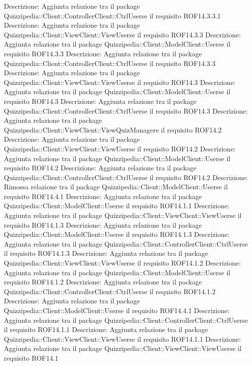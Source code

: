 Descrizione: Aggiunta relazione tra il package Quizzipedia::Client::ControllerClient::CtrlUserse il requisito ROF14.3.3.1 
Descrizione: Aggiunta relazione tra il package Quizzipedia::Client::ViewClient::ViewUserse il requisito ROF14.3.3 
Descrizione: Aggiunta relazione tra il package Quizzipedia::Client::ModelClient::Userse il requisito ROF14.3.3 
Descrizione: Aggiunta relazione tra il package Quizzipedia::Client::ControllerClient::CtrlUserse il requisito ROF14.3.3 
Descrizione: Aggiunta relazione tra il package Quizzipedia::Client::ViewClient::ViewUserse il requisito ROF14.3 
Descrizione: Aggiunta relazione tra il package Quizzipedia::Client::ModelClient::Userse il requisito ROF14.3 
Descrizione: Aggiunta relazione tra il package Quizzipedia::Client::ControllerClient::CtrlUserse il requisito ROF14.3 
Descrizione: Aggiunta relazione tra il package Quizzipedia::Client::ViewClient::ViewQuizManagere il requisito ROF14.2 
Descrizione: Aggiunta relazione tra il package Quizzipedia::Client::ViewClient::ViewUserse il requisito ROF14.2 
Descrizione: Aggiunta relazione tra il package Quizzipedia::Client::ModelClient::Userse il requisito ROF14.2 
Descrizione: Aggiunta relazione tra il package Quizzipedia::Client::ControllerClient::CtrlUserse il requisito ROF14.2 
Descrizione: Rimossa relazione tra il package Quizzipedia::Client::ModelClient::Userse il requisito ROF14.4.1 
Descrizione: Aggiunta relazione tra il package Quizzipedia::Client::ModelClient::Userse il requisito ROF14.1.1 
Descrizione: Aggiunta relazione tra il package Quizzipedia::Client::ViewClient::ViewUserse il requisito ROF14.1.3 
Descrizione: Aggiunta relazione tra il package Quizzipedia::Client::ModelClient::Userse il requisito ROF14.1.3 
Descrizione: Aggiunta relazione tra il package Quizzipedia::Client::ControllerClient::CtrlUserse il requisito ROF14.1.3 
Descrizione: Aggiunta relazione tra il package Quizzipedia::Client::ViewClient::ViewUserse il requisito ROF14.1.2 
Descrizione: Aggiunta relazione tra il package Quizzipedia::Client::ModelClient::Userse il requisito ROF14.1.2 
Descrizione: Aggiunta relazione tra il package Quizzipedia::Client::ControllerClient::CtrlUserse il requisito ROF14.1.2 
Descrizione: Aggiunta relazione tra il package Quizzipedia::Client::ModelClient::Userse il requisito ROF14.4.1 
Descrizione: Aggiunta relazione tra il package Quizzipedia::Client::ControllerClient::CtrlUserse il requisito ROF14.1.1 
Descrizione: Aggiunta relazione tra il package Quizzipedia::Client::ViewClient::ViewUserse il requisito ROF14.1.1 
Descrizione: Aggiunta relazione tra il package Quizzipedia::Client::ViewClient::ViewUserse il requisito ROF14.1 
